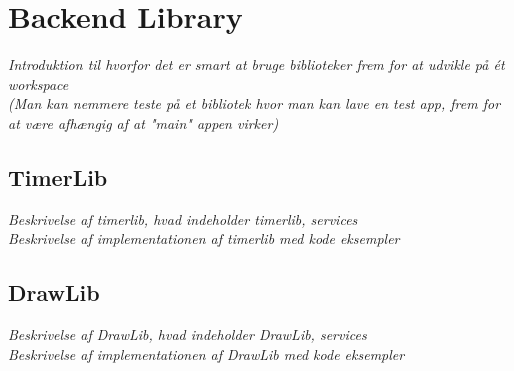 \section{Backend Library}
\textit{Introduktion til hvorfor det er smart at bruge biblioteker frem for at udvikle på ét workspace\\
(Man kan nemmere teste på et bibliotek hvor man kan lave en test app, frem for at være afhængig af at "main" appen virker)}

\subsection{TimerLib}
\textit{Beskrivelse af timerlib, hvad indeholder timerlib, services\\
Beskrivelse af implementationen af timerlib med kode eksempler}

\subsection{DrawLib}
\textit{Beskrivelse af DrawLib, hvad indeholder DrawLib, services\\
Beskrivelse af implementationen af DrawLib med kode eksempler}